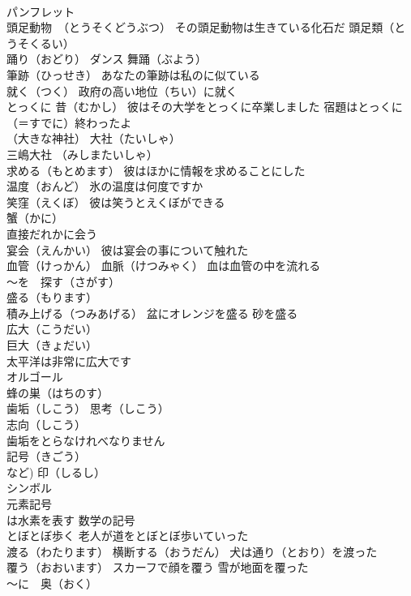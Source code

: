 \documentclass[8pt]{extreport}
\begin{document}
\begin{CJK}{UTF8}{min}
\\	パンフレット
\\	頭足動物　（とうそくどうぶつ） その頭足動物は生きている化石だ 頭足類（とうそくるい）
\\	踊り（おどり） ダンス 舞踊（ぶよう）
\\	筆跡（ひっせき） あなたの筆跡は私のに似ている
\\	就く（つく） 政府の高い地位（ちい）に就く
\\	とっくに 昔（むかし） 彼はその大学をとっくに卒業しました 宿題はとっくに（＝すでに）終わったよ
\\	（大きな神社）	大社（たいしゃ） 
\\	三嶋大社 （みしまたいしゃ）
\\	求める（もとめます） 彼はほかに情報を求めることにした
\\	温度（おんど） 氷の温度は何度ですか
\\	笑窪（えくぼ） 彼は笑うとえくぼができる
\\	蟹（かに）
\\	直接だれかに会う
\\	宴会（えんかい） 彼は宴会の事について触れた
\\	血管（けっかん） 血脈（けつみゃく） 血は血管の中を流れる
\\	～を　探す（さがす）
\\	盛る（もります） 
\\	積み上げる（つみあげる） 盆にオレンジを盛る 砂を盛る
\\	広大（こうだい）
\\	巨大（きょだい）
\\	太平洋は非常に広大です
\\	オルゴール
\\	蜂の巣（はちのす）
\\	歯垢（しこう） 思考（しこう）
\\	志向（しこう）
\\	歯垢をとらなけれべなりません
\\	記号（きごう）
\\	など) 印（しるし） 
\\	シンボル 
\\	元素記号
\\	は水素を表す 数学の記号
\\	とぼとぼ歩く 老人が道をとぼとぼ歩いていった
\\	渡る（わたります） 横断する（おうだん） 犬は通り（とおり）を渡った
\\	覆う（おおいます） スカーフで顔を覆う 雪が地面を覆った
\\	～に　奥（おく）

\end{CJK}
\end{document}
